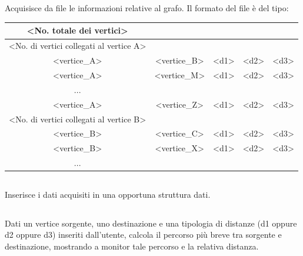 \documentclass[11pt, a4paper, titlepage, block]{article}
\begin{document}
	\subsection{}
	Acquisisce da file le informazioni relative al grafo. Il formato del file \`{e} del tipo:\\
	\begin{tabular}{|c|c|c|c|c|}
\hline
	{\textless}No. totale dei vertici{\textgreater} & & & & \\
\hline
	{\textless}No. di vertici collegati al vertice A{\textgreater} & & & & \\
\hline
	{\textless}vertice\_A{\textgreater} & {\textless}vertice\_B{\textgreater} & {\textless}d1{\textgreater} & {\textless}d2{\textgreater} & {\textless}d3{\textgreater}\\
\hline
	{\textless}vertice\_A{\textgreater} & {\textless}vertice\_M{\textgreater} & {\textless}d1{\textgreater} & {\textless}d2{\textgreater} & {\textless}d3{\textgreater}\\
\hline
	... & & & &\\
\hline
	{\textless}vertice\_A{\textgreater} & {\textless}vertice\_Z{\textgreater} & {\textless}d1{\textgreater} & {\textless}d2{\textgreater} & {\textless}d3{\textgreater}\\
\hline
	{\textless}No. di vertici collegati al vertice B{\textgreater} & & & &\\
\hline
	{\textless}vertice\_B{\textgreater} & {\textless}vertice\_C{\textgreater} & {\textless}d1{\textgreater} & {\textless}d2{\textgreater} & {\textless}d3{\textgreater}\\
\hline
	{\textless}vertice\_B{\textgreater} & {\textless}vertice\_X{\textgreater} & {\textless}d1{\textgreater} & {\textless}d2{\textgreater} & {\textless}d3{\textgreater}\\
\hline
	... & & & &\\
\hline
\end{tabular}
	\subsection{}
	Inserisce i dati acquisiti in una opportuna struttura dati.
	\subsection{}
	Dati un vertice sorgente, uno destinazione e una tipologia di distanze (d1 oppure d2 oppure d3) inseriti dall’utente, calcola il percorso pi\`{u} breve tra sorgente e destinazione, mostrando a
monitor tale percorso e la relativa distanza.
\end{document}
